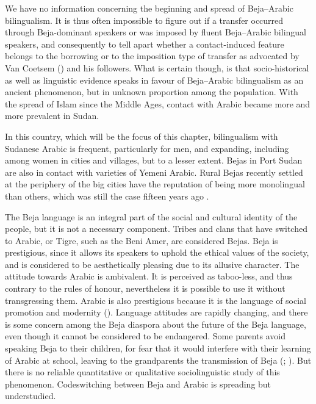 \documentclass[output=paper]{langsci/langscibook}
\begin{document}
We have no information concerning the beginning and spread of Beja--Arabic bilingualism. It is thus often impossible to figure out if a transfer occurred through Beja-dominant speakers or was imposed by fluent Beja--Arabic bilingual speakers, and consequently to tell apart whether a contact-induced feature belongs to the borrowing or to the imposition type of transfer as advocated by Van Coetsem (\citeyear{VanCoetsem1988,VanCoetsem2000}) and his followers. What is certain though, is that socio-historical as well as linguistic evidence speaks in favour of Beja--Arabic bilingualism as an ancient phenomenon, but in unknown proportion among the population. With the spread of Islam since the Middle Ages, contact with Arabic became more and more prevalent in Sudan. 

In this country, which will be the focus of this chapter, bilingualism with Sudanese Arabic is frequent, particularly for men, and expanding, including among women in cities and villages, but to a lesser extent. Bejas in Port Sudan are also in contact with varieties of Yemeni Arabic. Rural Bejas recently settled at the periphery of the big cities have the reputation of being more monolingual than others, which was still the case fifteen years ago \citep{Vanhove2003}.

The Beja language is an integral part of the social and cultural identity of the people, but it is not a necessary component. Tribes and clans that have switched to Arabic, or Tigre, such as the Beni Amer, are considered Bejas. Beja is prestigious, since it allows its speakers to uphold the ethical values of the society, and is considered to be aesthetically pleasing due to its allusive character. The attitude towards Arabic is ambivalent. It is perceived as taboo-less, and thus contrary to the rules of honour, nevertheless it is possible to use it without transgressing them. Arabic is also prestigious because it is the language of social promotion and modernity (\citealt{HamidAhmed2005article}). Language attitudes are rapidly changing, and there is some concern among the Beja diaspora about the future of the Beja language, even though it cannot be considered to be endangered. Some parents avoid speaking Beja to their children, for fear that it would interfere with their learning of Arabic at school, leaving to the grandparents the transmission of Beja (\citealt{Wedekind2012}; \citealt{Vanhove2017}). But there is no reliable quantitative or qualitative sociolinguistic study of this phenomenon. Codeswitching between Beja and Arabic is spreading but understudied.
\end{document}
